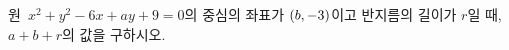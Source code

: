 원~$x^2+y^2-6x+ay+9=0$의 중심의 좌표가 $(b{,}\mkern3mu\mathopen{}-3)$이고 반지름의 길이가 $r$일 때, $a+b+r$의 값을 구하시오. 
